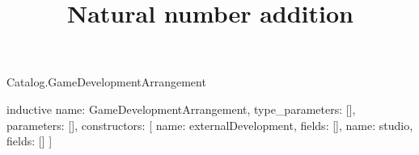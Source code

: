 \begin{lexlean}{Catalog.GameDevelopmentArrangement}
\title{Natural number addition}
\begin{semanticmodule}
inductive{
  name: GameDevelopmentArrangement,
  type_parameters: [],
  parameters: [],
  constructors: [
    {name: externalDevelopment, fields: []},
    {name: studio, fields: []}
  ]
}
\end{semanticmodule}
\end{lexlean}
